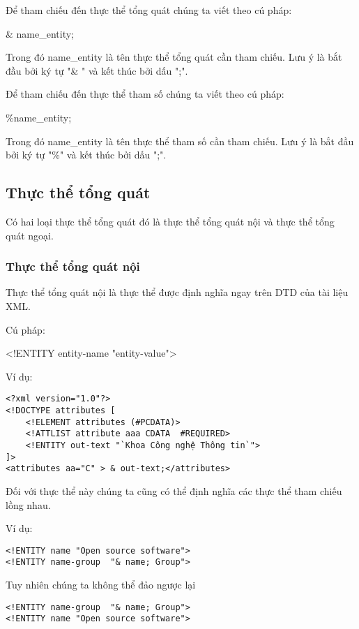   Để tham chiếu đến thực thể tổng quát chúng ta viết theo cú pháp:
  
{\ttfamily   \& name\_entity;}
  
  Trong đó {\ttfamily name\_entity} là tên thực thể tổng quát cần tham chiếu. Lưu ý là bắt đầu bởi ký tự "\& " và kết thúc bởi dấu ";".
  
  Để tham chiếu đến thực thể tham số chúng ta viết theo cú pháp:
   
{\ttfamily   \%name\_entity;} 
  
 Trong đó {\ttfamily name\_entity} là tên thực thể tham số cần tham chiếu. Lưu ý là bắt đầu bởi ký tự "\%" và kết thúc bởi dấu ";".
\subsection{Thực thể tổng quát }
Có hai loại thực thể tổng quát đó là thực thể tổng quát nội và thực thể tổng quát ngoại.
\subsubsection{Thực thể tổng quát nội }
Thực thể tổng quát nội là thực thể được định nghĩa ngay trên DTD của tài liệu XML.

Cú pháp:

\begin{center}
 {\ttfamily
 \indent <!ENTITY entity-name "entity-value">
 }
\end{center}

Ví dụ:
\lstset{language=XML}
\begin{lstlisting}[escapechar=`]
<?xml version="1.0"?> 
<!DOCTYPE attributes [ 
	<!ELEMENT attributes (#PCDATA)> 
	<!ATTLIST attribute aaa CDATA  #REQUIRED> 
	<!ENTITY out-text "`Khoa Công nghệ Thông tin`"> 
]> 
<attributes aa="C" > & out-text;</attributes> 
\end{lstlisting}

Đối với thực thể này chúng ta cũng có thể định nghĩa các thực thể tham chiếu lồng nhau. 

Ví dụ:
\lstset{language=XML}
\begin{lstlisting}
<!ENTITY name "Open source software"> 
<!ENTITY name-group  "& name; Group">
\end{lstlisting}

Tuy nhiên chúng ta không thể đảo ngược lại 
\lstset{language=XML}
\begin{lstlisting}
<!ENTITY name-group  "& name; Group"> 
<!ENTITY name "Open source software">
\end{lstlisting}
